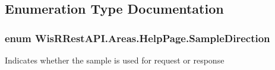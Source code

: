 \subsection{Enumeration Type Documentation}
\hypertarget{namespace_wis_r_rest_a_p_i_1_1_areas_1_1_help_page_a5e9118cc1fa882599364690b402f67c7}{}
\subsubsection[{Sample\+Direction}]{\setlength{\rightskip}{0pt plus 5cm}enum {\bf Wis\+R\+Rest\+A\+P\+I.\+Areas.\+Help\+Page.\+Sample\+Direction}\hspace{0.3cm}{\ttfamily [strong]}}\label{namespace_wis_r_rest_a_p_i_1_1_areas_1_1_help_page_a5e9118cc1fa882599364690b402f67c7}


Indicates whether the sample is used for request or response 

